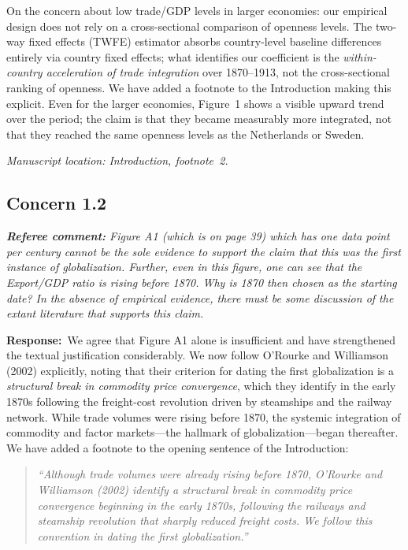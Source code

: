 \documentclass[11pt]{article}
\newcommand{\RC}[1]{\begin{refereebox}\textit{\textbf{Referee comment:} #1}\end{refereebox}}
\newcommand{\AR}{\noindent\textbf{Response:}\ }
\begin{document}
On the concern about low trade/GDP levels in larger economies: our empirical design does not rely on a cross-sectional comparison of openness levels. The two-way fixed effects (TWFE) estimator absorbs country-level baseline differences entirely via country fixed effects; what identifies our coefficient is the \emph{within-country acceleration of trade integration} over 1870--1913, not the cross-sectional ranking of openness. We have added a footnote to the Introduction making this explicit. Even for the larger economies, Figure~1 shows a visible upward trend over the period; the claim is that they became measurably more integrated, not that they reached the same openness levels as the Netherlands or Sweden.

\smallskip\noindent\textit{Manuscript location: Introduction, footnote~2.}

\subsection*{Concern 1.2}

\RC{Figure A1 (which is on page 39) which has one data point per century cannot be the sole evidence to support the claim that this was the first instance of globalization. Further, even in this figure, one can see that the Export/GDP ratio is rising before 1870. Why is 1870 then chosen as the starting date? In the absence of empirical evidence, there must be some discussion of the extant literature that supports this claim.}

\AR We agree that Figure A1 alone is insufficient and have strengthened the textual justification considerably. We now follow O'Rourke and Williamson (2002) explicitly, noting that their criterion for dating the first globalization is a \emph{structural break in commodity price convergence}, which they identify in the early 1870s following the freight-cost revolution driven by steamships and the railway network. While trade volumes were rising before 1870, the systemic integration of commodity and factor markets---the hallmark of globalization---began thereafter. We have added a footnote to the opening sentence of the Introduction:

\begin{quote}
\textit{``Although trade volumes were already rising before 1870, O'Rourke and Williamson (2002) identify a structural break in commodity price convergence beginning in the early 1870s, following the railways and steamship revolution that sharply reduced freight costs. We follow this convention in dating the first globalization.''}
\end{quote}
\end{document}

